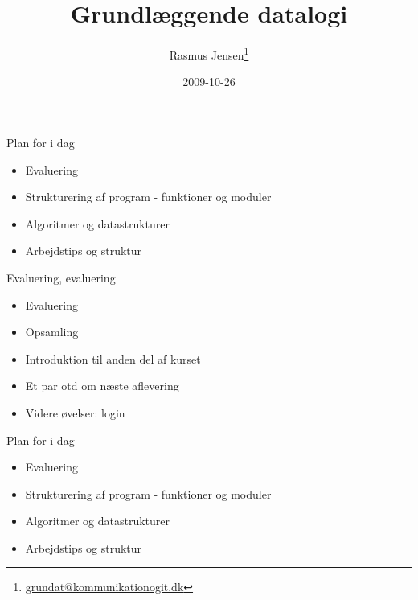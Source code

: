 \documentclass[a4paper,landscape]{slides}
\title{Grundlæggende datalogi}
\author{Rasmus Jensen\footnote{\url{grundat@kommunikationogit.dk}}}
\date{2009-10-26}
\begin{document}
\maketitle
\begin{slide}
	\begin{center} {\large 
            Plan for i dag
	} \end{center}
	\begin{itemize} \addtolength{\itemsep}{-\baselineskip}
            \item Evaluering
            \item Strukturering af program - funktioner og moduler
            \item Algoritmer og datastrukturer
            \item Arbejdstips og struktur
	\end{itemize}
\end{slide}

\begin{slide}
	\begin{center} {\large 
           Evaluering, evaluering
	} \end{center}
	\begin{itemize} \addtolength{\itemsep}{-\baselineskip}
                \item Evaluering
                \item Opsamling
                \item Introduktion til anden del af kurset
                \item Et par otd om næste aflevering
                \item Videre øvelser: login
	\end{itemize}
\end{slide}

\begin{slide}
	\begin{center} {\large 
            Plan for i dag
	} \end{center}
	\begin{itemize} \addtolength{\itemsep}{-\baselineskip}
            \item Evaluering
            \item Strukturering af program - funktioner og moduler
            \item Algoritmer og datastrukturer
            \item Arbejdstips og struktur
	\end{itemize}
\end{slide}
\end{document}
